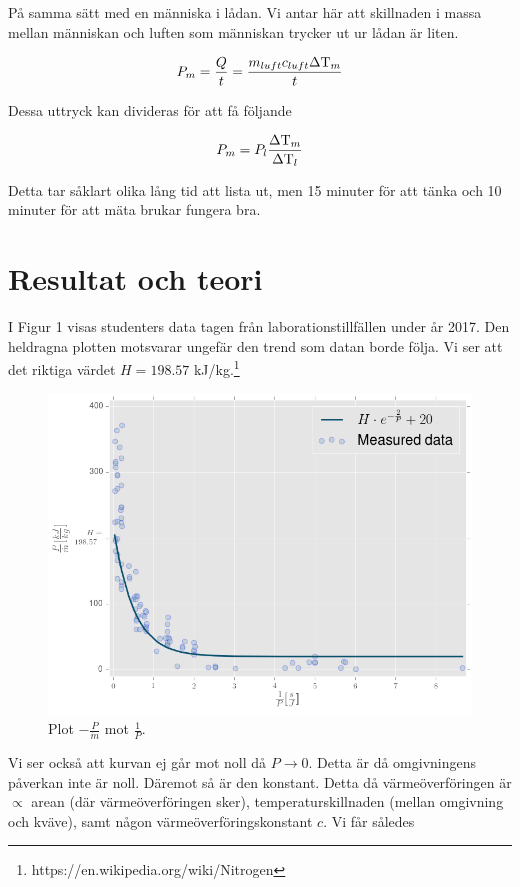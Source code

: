 \documentclass[11pt]{article}
\begin{document}
På samma sätt med en människa i lådan. Vi antar här att skillnaden i massa mellan människan och luften som människan trycker ut ur lådan är liten.

\begin{equation*}
    P_m = \frac{Q}{t} = \frac{m_{luft} c_{luft} \Delta \text T_m}{t}
\end{equation*}

Dessa uttryck kan divideras för att få följande

\begin{equation*}
    P_m = P_l \frac{\Delta \text T_m}{\Delta \text T_l}
\end{equation*}

Detta tar såklart olika lång tid att lista ut, men 15 minuter för att tänka och 10 minuter för att mäta brukar fungera bra.

\section{Resultat och teori}

I Figur 1 visas studenters data tagen från laborationstillfällen under år 2017. Den heldragna plotten motsvarar ungefär den trend som datan borde följa. Vi ser att det riktiga värdet $H = 198.57$ kJ/kg.\footnote{https://en.wikipedia.org/wiki/Nitrogen}

\begin{figure}[h]
\center
    \includegraphics[width = .75\linewidth]{./figures/nitrogenEnthalpy.png}
    \caption{Plot $- \frac{P}{\dot m}$ mot $\frac{1}{P}$.}
\label{Fig: HCurve}
\end{figure}

Vi ser också att kurvan ej går mot noll då $P \to 0$. Detta är då omgivningens påverkan inte är noll. Däremot så är den konstant. Detta då värmeöverföringen är $\propto$ arean (där värmeöverföringen sker), temperaturskillnaden (mellan omgivning och kväve), samt någon värmeöverföringskonstant $c$. Vi får således
\end{document}
